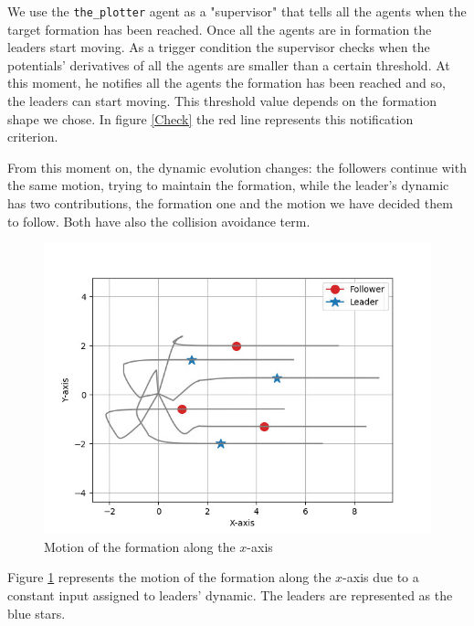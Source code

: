 \documentclass[a4paper,11pt,oneside]{book}
\begin{document}
\bigskip
We use the \texttt{the\_plotter} agent as a "supervisor" that tells all the agents when the target formation has been reached. Once all the agents are in formation the leaders start moving. As a trigger condition the supervisor checks when the potentials' derivatives of all the agents are smaller than a certain threshold. At this moment, he notifies all the agents the formation has been reached and so, the leaders can start moving. This threshold value depends on the formation shape we chose. In figure \ref{Check} the red line represents this notification criterion.

\bigskip
From this moment on, the dynamic evolution changes: the followers continue with the same motion, trying to maintain the formation, while the leader's dynamic has two contributions, the formation one and the motion we have decided them to follow. Both have also the collision avoidance term.

\begin{figure}[h]
\centering
	\includegraphics[scale=0.4]{Moving_hexagon_formation_linear.jpg}
	\caption{Motion of the formation along the $x$-axis}
	\label{Formation_motion_lin}
\end{figure}

Figure \ref{Formation_motion_lin} represents the motion of the formation along the $x$-axis due to a constant input assigned to leaders' dynamic. The leaders are represented as the blue stars.
\end{document}
